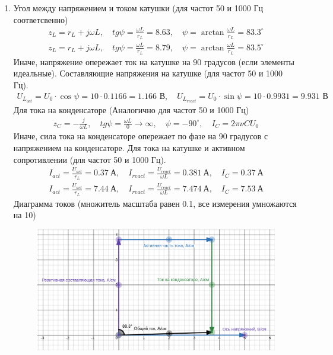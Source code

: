 \documentclass[a4paper, 12pt]{article}
\begin{document}
\begin{enumerate}
    \item Угол между напряжением и током катушки (для частот 50 и 1000 Гц соответсвенно)
    \begin{align}
        z_{L} = r_{L} + j\omega L, \quad
        tg\psi = \frac{\omega L}{r_{L}} = 8.63, \quad \psi = \arctan\frac{\omega L}{r_{L}} = 83.3^{\circ}\\
        z_{L} = r_{L} + j\omega L, \quad
        tg\psi = \frac{\omega L}{r_{L}} = 8.79, \quad \psi = \arctan\frac{\omega L}{r_{L}} = 83.5^{\circ}
    \end{align}
    Иначе, напряжение опережает ток на катушке на 90 градусов (если элементы идеальные).
    Составляющие напряжения на катушке (для частот 50 и 1000 Гц).
    \begin{align*}
        U_{L_{act}} = U_{0} \cdot \cos \psi = 10 \cdot 0.1166 = 1.166\text{ В}, \quad
        U_{L_{react}} = U_{0} \cdot \sin \psi = 10 \cdot 0.9931 = 9.931\text{ В}
    \end{align*}
    Для тока на конденсаторе (Аналогично для частот 50 и 1000 Гц)
    \begin{align}
        z_{C} = -\frac{j}{\omega L}, \quad tg\psi = \frac{\omega L}{0} \rightarrow \infty, \quad \psi = -90^{\circ}, \quad I_{C} = 2\pi\nu CU_{0}
    \end{align}
    Иначе, сила тока на конденсаторе опережает по фазе на 90 градусов с напряжением на конденсаторе.
    Для тока на катушке и активном сопротивлении (для частот 50 и 1000 Гц).
    \begin{align}
        I_{act} = \frac{U_{act}}{r_{L}} = 0.37\ \text{А}, \quad I_{react} = \frac{U_{react}}{\omega L} = 0.381\ \text{А}, \quad I_{C} = 0.37\ \text{А}\\
        I_{act} = \frac{U_{act}}{r_{L}} = 7.44\ \text{А}, \quad I_{react} = \frac{U_{react}}{\omega L} = 7.474\ \text{А}, \quad I_{C} = 7.53\ \text{А}
    \end{align}
    Диаграмма токов (множитель масштаба равен 0.1, все измерения умножаются на 10)
    \begin{figure}[H]
        \centering
        \includegraphics[width=0.7\linewidth]{i_diag.png}

\end{figure}
\end{enumerate}
\end{document}
